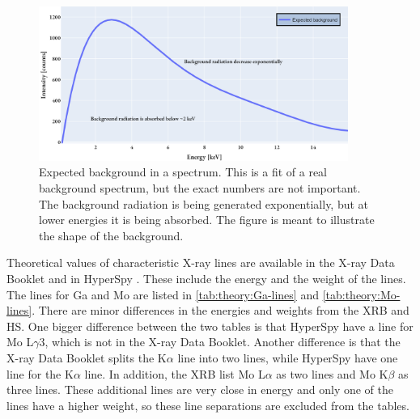 \begin{figure}[p]
    \centering
    \includegraphics[width=0.9\textwidth]{figures/expected_background.png}
    \caption{
        Expected background in a spectrum.
        This is a fit of a real background spectrum, but the exact numbers are not important.
        The background radiation is being generated exponentially, but at lower energies it is being absorbed.
        The figure is meant to illustrate the shape of the background.
    }
    \label{fig:theory:expected_background}
\end{figure}




Theoretical values of characteristic X-ray lines are available in the X-ray Data Booklet \cite{thompson_x-ray_2004} and in HyperSpy \cite{hyperspy_1.7.1}.
These include the energy and the weight of the lines.
The lines for Ga and Mo are listed in \cref{tab:theory:Ga-lines} and \cref{tab:theory:Mo-lines}.
There are minor differences in the energies and weights from the XRB and HS.
One bigger difference between the two tables is that HyperSpy have a line for Mo L$\gamma$3, which is not in the X-ray Data Booklet.
Another difference is that the X-ray Data Booklet splits the K$\alpha$ line into two lines, while HyperSpy have one line for the K$\alpha$ line.
In addition, the XRB list Mo L$\alpha$ as two lines and Mo K$\beta$ as three lines.
These additional lines are very close in energy and only one of the lines have a higher weight, so these line separations are excluded from the tables.






\clearpage











